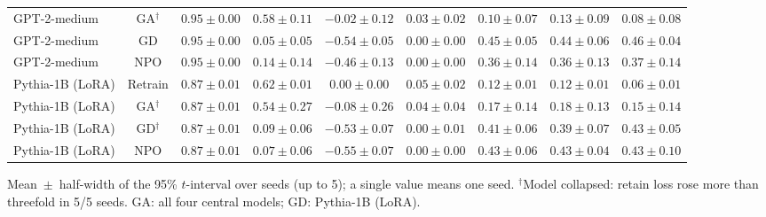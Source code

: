 \begin{table}[t]
\begin{tabular*}{\textwidth}{@{\extracolsep{\fill}}lcccccccc@{}}
GPT-2-medium & GA$^{\dagger}$ & $0.95 \pm 0.00$ & $0.58 \pm 0.11$ & $-0.02 \pm 0.12$ & $0.03 \pm 0.02$ & $0.10 \pm 0.07$ & $0.13 \pm 0.09$ & $0.08 \pm 0.08$ \\
GPT-2-medium & GD & $0.95 \pm 0.00$ & $0.05 \pm 0.05$ & $-0.54 \pm 0.05$ & $0.00 \pm 0.00$ & $0.45 \pm 0.05$ & $0.44 \pm 0.06$ & $0.46 \pm 0.04$ \\
GPT-2-medium & NPO & $0.95 \pm 0.00$ & $0.14 \pm 0.14$ & $-0.46 \pm 0.13$ & $0.00 \pm 0.00$ & $0.36 \pm 0.14$ & $0.36 \pm 0.13$ & $0.37 \pm 0.14$ \\
Pythia-1B (LoRA) & Retrain & $0.87 \pm 0.01$ & $0.62 \pm 0.01$ & $0.00 \pm 0.00$ & $0.05 \pm 0.02$ & $0.12 \pm 0.01$ & $0.12 \pm 0.01$ & $0.06 \pm 0.01$ \\
Pythia-1B (LoRA) & GA$^{\dagger}$ & $0.87 \pm 0.01$ & $0.54 \pm 0.27$ & $-0.08 \pm 0.26$ & $0.04 \pm 0.04$ & $0.17 \pm 0.14$ & $0.18 \pm 0.13$ & $0.15 \pm 0.14$ \\
Pythia-1B (LoRA) & GD$^{\dagger}$ & $0.87 \pm 0.01$ & $0.09 \pm 0.06$ & $-0.53 \pm 0.07$ & $0.00 \pm 0.01$ & $0.41 \pm 0.06$ & $0.39 \pm 0.07$ & $0.43 \pm 0.05$ \\
Pythia-1B (LoRA) & NPO & $0.87 \pm 0.01$ & $0.07 \pm 0.06$ & $-0.55 \pm 0.07$ & $0.00 \pm 0.00$ & $0.43 \pm 0.06$ & $0.43 \pm 0.04$ & $0.43 \pm 0.10$ \\
\bottomrule
\end{tabular*}

\smallskip
{\footnotesize Mean~$\pm$~half-width of the 95\% $t$-interval over seeds (up to 5); a single value means one seed. $^{\dagger}$Model collapsed: retain loss rose more than threefold in 5/5 seeds. GA: all four central models; GD: Pythia-1B (LoRA).\par}
\end{table}
